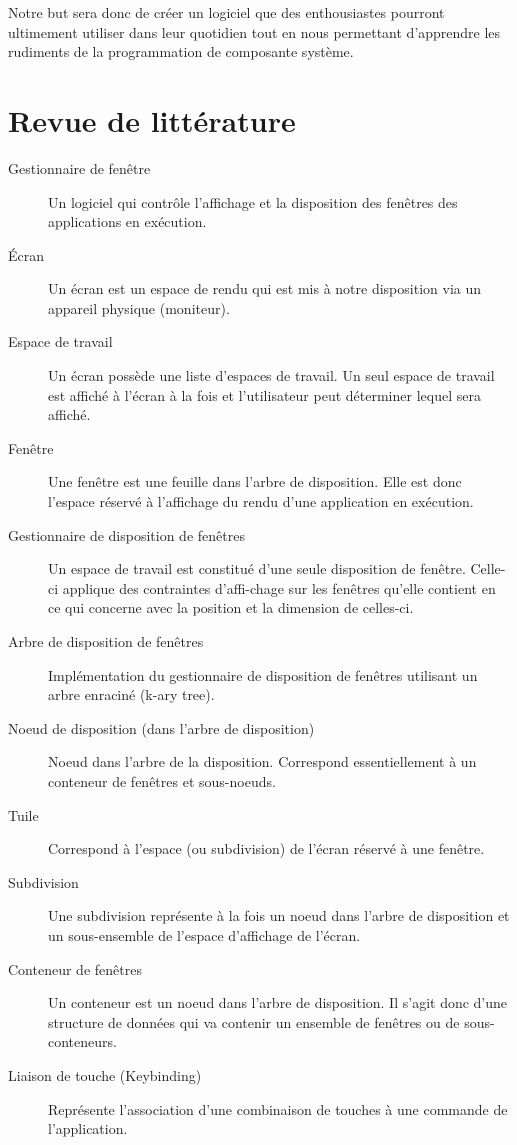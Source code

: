 \documentclass[titlepage]{article}
\begin{document}
\par
\bigskip
Notre but sera donc de créer un logiciel que des enthousiastes pourront ultimement utiliser dans leur quotidien tout en nous permettant d’apprendre les rudiments de la programmation de composante système.

\section{Revue de littérature}
\begin{description}
	\item [Gestionnaire de fenêtre] Un logiciel qui contrôle l’affichage et la disposition des fenêtres des applications en exécution.
	\item [Écran] Un écran est un espace de rendu qui est mis à notre disposition via un appareil physique (moniteur).
	\item [Espace de travail] Un écran possède une liste d’espaces de travail. Un seul espace de travail est affiché à l’écran à la fois et l'utilisateur peut déterminer lequel sera affiché.
	\item [Fenêtre] Une fenêtre est une feuille dans l’arbre de disposition. Elle est donc l’espace réservé à l’affichage du rendu d’une application en exécution.
	\item [Gestionnaire de disposition de fenêtres]
			Un espace de travail est constitué d’une seule disposition de fenêtre. Celle-ci applique des contraintes d'affi-chage sur les fenêtres qu'elle contient en ce qui concerne avec la position et la dimension de celles-ci.
	\item [Arbre de disposition de fenêtres] Implémentation du gestionnaire de disposition de fenêtres utilisant un arbre enraciné (k-ary tree).
	\item [Noeud de disposition (dans l’arbre de disposition)] Noeud dans l’arbre de la disposition. Correspond essentiellement à un conteneur de fenêtres et sous-noeuds.
	\item [Tuile] Correspond à l’espace (ou subdivision) de l’écran réservé à une  fenêtre.
	\item [Subdivision] Une subdivision représente à la fois un noeud dans l’arbre de disposition et un sous-ensemble de l’espace d’affichage de l’écran.
	\item [Conteneur de fenêtres] Un conteneur est un noeud dans l’arbre de disposition. Il s’agit donc d’une structure de données qui va contenir un ensemble de fenêtres ou de sous-conteneurs.
	\item [Liaison de touche (Keybinding)] Représente l'association d'une combinaison de touches à une commande de l'application.

\end{description}
\end{document}
